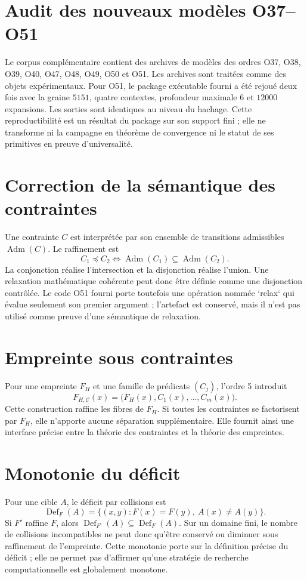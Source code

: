 \documentclass[11pt,a4paper,openany]{book}
\newcommand{\Adm}{\operatorname{Adm}}
\newcommand{\Def}{\operatorname{Def}}
\begin{document}
\section{Audit des nouveaux modèles O37--O51}
Le corpus complémentaire contient des archives de modèles des ordres O37, O38, O39, O40, O47, O48, O49, O50 et O51. Les archives sont traitées comme des objets expérimentaux. Pour O51, le package exécutable fourni a été rejoué deux fois avec la graine $5151$, quatre contextes, profondeur maximale $6$ et $12000$ expansions. Les sorties sont identiques au niveau du hachage. Cette reproductibilité est un résultat du package sur son support fini ; elle ne transforme ni la campagne en théorème de convergence ni le statut de ses primitives en preuve d'universalité.

\section{Correction de la sémantique des contraintes}
Une contrainte $C$ est interprétée par son ensemble de transitions admissibles $\Adm(C)$. Le raffinement est
\[
C_1\preceq C_2 \iff \Adm(C_1)\subseteq\Adm(C_2).
\]
La conjonction réalise l'intersection et la disjonction réalise l'union. Une relaxation mathématique cohérente peut donc être définie comme une disjonction contrôlée. Le code O51 fourni porte toutefois une opération nommée `relax` qui évalue seulement son premier argument ; l'artefact est conservé, mais il n'est pas utilisé comme preuve d'une sémantique de relaxation.

\section{Empreinte sous contraintes}
Pour une empreinte $F_H$ et une famille de prédicats $(C_j)$, l'ordre 5 introduit
\[
F_{H,\mathcal C}(x)=\bigl(F_H(x),C_1(x),\ldots,C_m(x)\bigr).
\]
Cette construction raffine les fibres de $F_H$. Si toutes les contraintes se factorisent par $F_H$, elle n'apporte aucune séparation supplémentaire. Elle fournit ainsi une interface précise entre la théorie des contraintes et la théorie des empreintes.

\section{Monotonie du déficit}
Pour une cible $A$, le déficit par collisions est
\[
\Def_F(A)=\{(x,y):F(x)=F(y),\ A(x)\ne A(y)\}.
\]
Si $F'$ raffine $F$, alors $\Def_{F'}(A)\subseteq\Def_F(A)$. Sur un domaine fini, le nombre de collisions incompatibles ne peut donc qu'être conservé ou diminuer sous raffinement de l'empreinte. Cette monotonie porte sur la définition précise du déficit ; elle ne permet pas d'affirmer qu'une stratégie de recherche computationnelle est globalement monotone.
\end{document}
